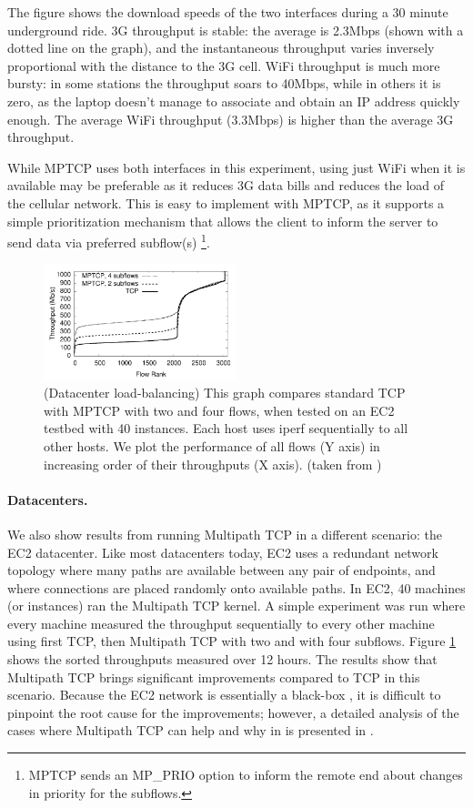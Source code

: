 The figure shows the download speeds of the two interfaces during a 30 minute underground ride. 3G throughput is stable: the average is 
2.3Mbps (shown with a dotted line on the graph), and the instantaneous throughput varies inversely proportional with the distance 
to the 3G cell. WiFi throughput is much more bursty: in some stations the throughput soars to 40Mbps, while in others it is zero, as 
the laptop doesn't manage to associate and obtain an IP address quickly enough. The average WiFi throughput (3.3Mbps) is higher 
than the average 3G throughput.

While MPTCP uses both interfaces in this experiment, using just WiFi when it is available may be preferable as it reduces 3G data bills
and reduces the load of the cellular network. This is easy to implement with MPTCP, as it supports a simple  prioritization mechanism 
that allows the client to inform the server to send data via preferred subflow(s) \footnote{MPTCP sends an MP\_PRIO option to 
inform the remote end about changes in priority for the subflows.}. 


\begin{figure}[t]
\centering
\includegraphics[width=0.5\textwidth]{figures/figure3}
\caption{(Datacenter load-balancing) This graph compares standard TCP with MPTCP 
with two and four flows, when tested on an EC2 testbed with 40 instances. Each host 
uses iperf sequentially to all other hosts. We plot the performance of all flows (Y axis)
in increasing order of their throughputs (X axis). (taken from \cite{raiciu2011improving})}
\label{fig:mptcp3}
\end{figure}

\paragraph{Datacenters.} We also show results from running Multipath TCP in a different scenario: the EC2 datacenter.
Like most datacenters today, EC2 uses a redundant network topology where many paths are 
available between any pair of endpoints, and where connections are placed randomly 
onto available paths. In EC2, 40 machines (or instances) ran the 
Multipath TCP kernel. A simple experiment was run where every machine measured
the throughput sequentially to every other machine using first TCP, then Multipath 
TCP with two and with four subflows. Figure \ref{fig:mptcp3} shows the sorted throughputs measured over 
12 hours. The results show that Multipath TCP brings significant improvements compared 
to TCP in this scenario. Because the EC2 network is essentially a black-box , it is 
difficult to pinpoint the root cause for the improvements; however, a
detailed analysis of the cases where Multipath TCP can help and why in is presented in 
\cite{raiciu2011improving}.

